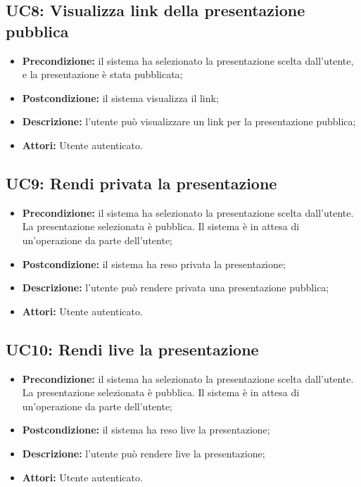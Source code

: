 \subsection{ UC8: Visualizza link della presentazione pubblica}

\begin{itemize}
	\item \textbf{Precondizione:} il sistema ha selezionato la presentazione scelta dall'utente, e la presentazione è stata pubblicata;
	\item \textbf{Postcondizione:} il sistema visualizza il link;
	\item \textbf{Descrizione:} l'utente può visualizzare un link per la presentazione pubblica;
	\item \textbf{Attori:} Utente autenticato.
\end{itemize}
\subsection{ UC9: Rendi privata la presentazione}

\begin{itemize}
	\item \textbf{Precondizione:} il sistema ha selezionato la presentazione scelta dall'utente. La presentazione selezionata è pubblica. Il sistema è in attesa di un'operazione da parte dell'utente;
	\item \textbf{Postcondizione:} il sistema ha reso privata la presentazione;
	\item \textbf{Descrizione:} l'utente può rendere privata una presentazione pubblica;
	\item \textbf{Attori:} Utente autenticato.
\end{itemize}
\subsection{ UC10: Rendi live la presentazione}

\begin{itemize}
	\item \textbf{Precondizione:} il sistema ha selezionato la presentazione scelta dall'utente. La presentazione selezionata è pubblica. Il sistema è in attesa di un'operazione da parte dell'utente;
	\item \textbf{Postcondizione:} il sistema ha reso live la presentazione;
	\item \textbf{Descrizione:} l'utente può rendere live la presentazione;
	\item \textbf{Attori:} Utente autenticato.
\end{itemize}
